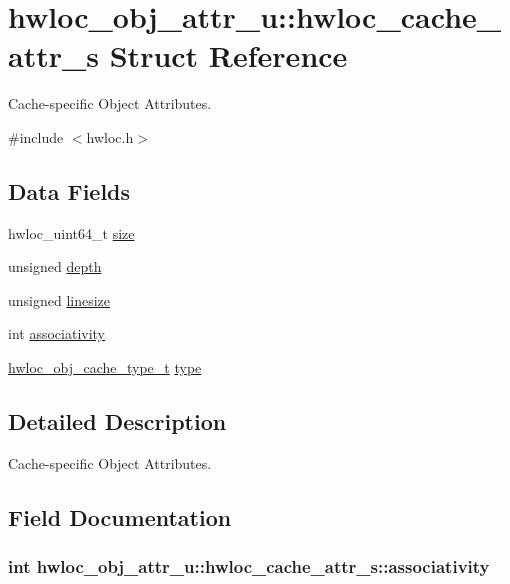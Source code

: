 \hypertarget{a00013}{
\section{hwloc\_\-obj\_\-attr\_\-u::hwloc\_\-cache\_\-attr\_\-s Struct Reference}
\label{a00013}
}


Cache-\/specific Object Attributes.  




{\ttfamily \#include $<$hwloc.h$>$}

\subsection*{Data Fields}
\begin{DoxyCompactItemize}
\item 
hwloc\_\-uint64\_\-t \hyperlink{a00013_abe5e788943ed04302976740c829674c0}{size}
\item 
unsigned \hyperlink{a00013_a5c8f7f39193736c2187ed626940835d5}{depth}
\item 
unsigned \hyperlink{a00013_a801e8a668e28caf06c8b88e9ae5c10db}{linesize}
\item 
int \hyperlink{a00013_ad06525e474d1e2d1423ed71bb998592d}{associativity}
\item 
\hyperlink{a00041_gab6e1e7efedae8b341f3ee14fbe53d66c}{hwloc\_\-obj\_\-cache\_\-type\_\-t} \hyperlink{a00013_ad8edc8ded2b7a70d6abbc874801930f4}{type}
\end{DoxyCompactItemize}


\subsection{Detailed Description}
Cache-\/specific Object Attributes. 

\subsection{Field Documentation}
\hypertarget{a00013_ad06525e474d1e2d1423ed71bb998592d}{
\subsubsection[{associativity}]{\setlength{\rightskip}{0pt plus 5cm}int {\bf hwloc\_\-obj\_\-attr\_\-u::hwloc\_\-cache\_\-attr\_\-s::associativity}}}
\label{a00013_ad06525e474d1e2d1423ed71bb998592d}


